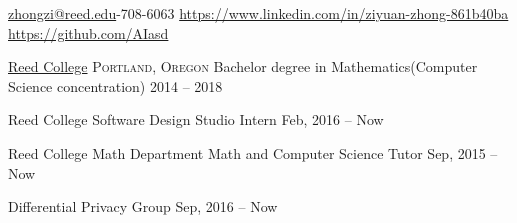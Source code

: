 \documentclass[10pt,a4paper]{article}
\begin{document}
\sloppy  %



\nobreakvspace{0.3em}  %

\noindent\href{mailto:zhongzi@reed.edu}{zhongzi\mbox{}@\mbox{}reed.edu}-708-6063\sbull
\href{https://www.linkedin.com/in/ziyuan-zhong-861b40ba}{https://www.linkedin.com/in/ziyuan-zhong-861b40ba}
\\\sbull
\href{https://github.com/AIasd}{https://github.com/AIasd}
\\

\spacedhrule{0.9em}{-0.4em}  %


\headedsection
  {\href{http://www.reed.edu}{Reed College}}
  {\textsc{Portland, Oregon}} {%
  \headedsubsection
    {Bachelor degree in Mathematics(Computer Science concentration)}
    {2014 -- 2018}
    {}
}

\spacedhrule{-0.2em}{-0.4em}

 \headedsection
  {Reed College Software Design Studio} {%
  \headedsubsection
    {Intern}
    {Feb, 2016 -- Now}
    {}}
   
 \headedsection
  {Reed College Math Department} {%
  \headedsubsection
    {Math and Computer Science Tutor}
    {Sep, 2015 -- Now}
    {}}

\spacedhrule{-0.2em}{-0.4em}

  \headedsubsection
    {Differential Privacy Group}
    {Sep, 2016 -- Now}
    {}
\end{document}
